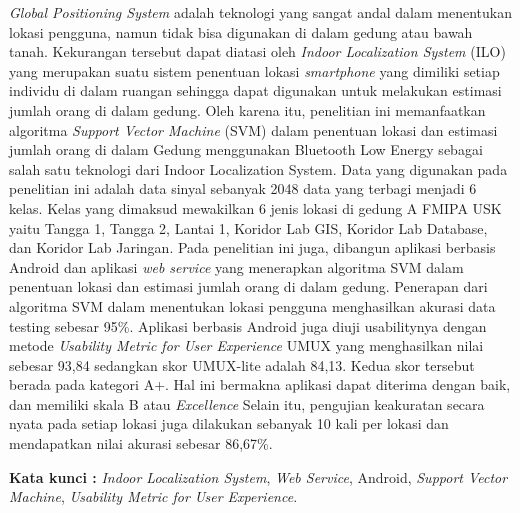 \begin{abstractind}
	\textit{Global Positioning System} adalah teknologi yang sangat andal dalam menentukan lokasi pengguna, namun tidak bisa digunakan di dalam gedung atau bawah tanah. Kekurangan tersebut dapat diatasi oleh \textit{Indoor Localization System} (ILO) yang merupakan suatu sistem penentuan lokasi \textit{smartphone} yang dimiliki setiap individu di dalam ruangan sehingga dapat digunakan untuk melakukan estimasi jumlah orang di dalam gedung. Oleh karena itu, penelitian ini memanfaatkan algoritma \textit{Support Vector Machine} (SVM) dalam penentuan lokasi dan estimasi jumlah orang di dalam Gedung menggunakan Bluetooth Low Energy sebagai salah satu teknologi dari Indoor Localization System. Data yang digunakan pada penelitian ini adalah data sinyal sebanyak 2048 data yang terbagi menjadi 6 kelas. Kelas yang dimaksud mewakilkan 6 jenis lokasi di gedung A FMIPA USK yaitu Tangga 1, Tangga 2, Lantai 1, Koridor Lab GIS, Koridor Lab Database, dan Koridor Lab Jaringan. Pada penelitian ini juga, dibangun aplikasi berbasis Android dan aplikasi \textit{web service} yang menerapkan algoritma SVM dalam penentuan lokasi dan estimasi jumlah orang di dalam gedung. Penerapan dari algoritma SVM dalam menentukan lokasi pengguna menghasilkan akurasi data testing sebesar 95\%. Aplikasi berbasis Android juga diuji usabilitynya dengan metode \textit{Usability Metric for User Experience} UMUX yang menghasilkan nilai  sebesar 93,84 sedangkan skor UMUX-lite adalah 84,13. Kedua skor tersebut berada pada kategori A+. Hal ini bermakna aplikasi dapat diterima dengan baik, dan memiliki skala B atau \textit{Excellence} Selain itu, pengujian keakuratan secara nyata  pada setiap lokasi juga dilakukan sebanyak 10 kali per lokasi dan mendapatkan nilai akurasi sebesar 86,67\%.

	\bigskip
	\noindent
	\textbf{Kata kunci :} \textit{Indoor Localization System}, \textit{Web Service}, Android, \textit{Support Vector Machine}, \textit{Usability Metric for User Experience}.
\end{abstractind}